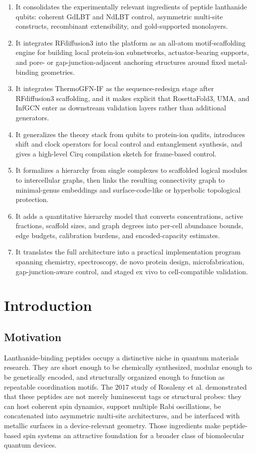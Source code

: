 \documentclass[11pt]{report}
\newcommand{\etal}{et al.}
\theoremstyle{definition}
\begin{document}
\begin{enumerate}[leftmargin=2em]
\item It consolidates the experimentally relevant ingredients of peptide lanthanide qubits: coherent GdLBT and NdLBT control, asymmetric multi-site constructs, recombinant extensibility, and gold-supported monolayers.
\item It integrates RFdiffusion3 into the platform as an all-atom motif-scaffolding engine for building local protein-ion subnetworks, actuator-bearing supports, and pore- or gap-junction-adjacent anchoring structures around fixed metal-binding geometries.
\item It integrates ThermoGFN-IF as the sequence-redesign stage after RFdiffusion3 scaffolding, and it makes explicit that RosettaFold3, UMA, and InfGCN enter as downstream validation layers rather than additional generators.
\item It generalizes the theory stack from qubits to protein-ion qudits, introduces shift and clock operators for local control and entanglement synthesis, and gives a high-level Cirq compilation sketch for frame-based control.
\item It formalizes a hierarchy from single complexes to scaffolded logical modules to intercellular graphs, then links the resulting connectivity graph to minimal-genus embeddings and surface-code-like or hyperbolic topological protection.
\item It adds a quantitative hierarchy model that converts concentrations, active fractions, scaffold sizes, and graph degrees into per-cell abundance bounds, edge budgets, calibration burdens, and encoded-capacity estimates.
\item It translates the full architecture into a practical implementation program spanning chemistry, spectroscopy, de novo protein design, microfabrication, gap-junction-aware control, and staged ex vivo to cell-compatible validation.
\end{enumerate}

\clearpage
{}

\chapter{Introduction}

\section{Motivation}
Lanthanide-binding peptides occupy a distinctive niche in quantum materials research. They are short enough to be chemically synthesized, modular enough to be genetically encoded, and structurally organized enough to function as repeatable coordination motifs. The 2017 study of Rosaleny \etal{} demonstrated that these peptides are not merely luminescent tags or structural probes: they can host coherent spin dynamics, support multiple Rabi oscillations, be concatenated into asymmetric multi-site architectures, and be interfaced with metallic surfaces in a device-relevant geometry. Those ingredients make peptide-based spin systems an attractive foundation for a broader class of biomolecular quantum devices.
\end{document}

